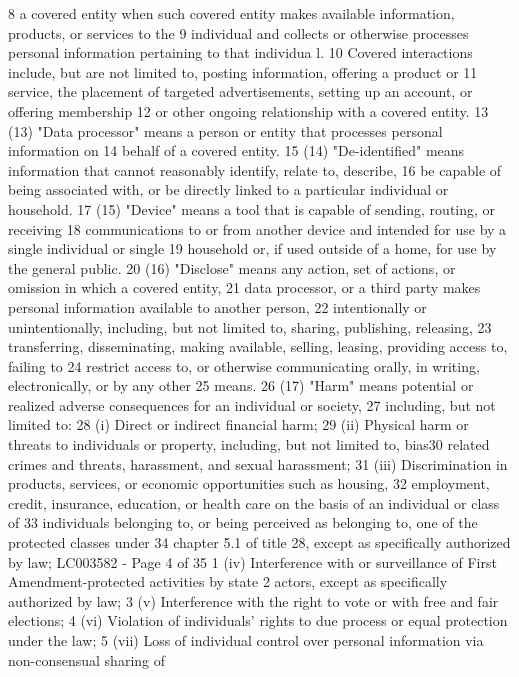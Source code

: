 8 a covered entity when such covered entity makes available information, products, or services to the
9 individual and collects or otherwise processes personal information pertaining to that individua l.
10 Covered interactions include, but are not limited to, posting information, offering a product or
11 service, the placement of targeted advertisements, setting up an account, or offering membership
12 or other ongoing relationship with a covered entity.
13 (13) "Data processor" means a person or entity that processes personal information on
14 behalf of a covered entity.
15 (14) "De-identified" means information that cannot reasonably identify, relate to, describe,
16 be capable of being associated with, or be directly linked to a particular individual or household.
17 (15) "Device" means a tool that is capable of sending, routing, or receiving
18 communications to or from another device and intended for use by a single individual or single
19 household or, if used outside of a home, for use by the general public.
20 (16) "Disclose" means any action, set of actions, or omission in which a covered entity,
21 data processor, or a third party makes personal information available to another person,
22 intentionally or unintentionally, including, but not limited to, sharing, publishing, releasing,
23 transferring, disseminating, making available, selling, leasing, providing access to, failing to
24 restrict access to, or otherwise communicating orally, in writing, electronically, or by any other
25 means.
26 (17) "Harm" means potential or realized adverse consequences for an individual or society,
27 including, but not limited to:
28 (i) Direct or indirect financial harm;
29 (ii) Physical harm or threats to individuals or property, including, but not limited to, bias30 related crimes and threats, harassment, and sexual harassment;
31 (iii) Discrimination in products, services, or economic opportunities such as housing,
32 employment, credit, insurance, education, or health care on the basis of an individual or class of
33 individuals belonging to, or being perceived as belonging to, one of the protected classes under
34 chapter 5.1 of title 28, except as specifically authorized by law;
LC003582 - Page 4 of 35
1 (iv) Interference with or surveillance of First Amendment-protected activities by state
2 actors, except as specifically authorized by law;
3 (v) Interference with the right to vote or with free and fair elections;
4 (vi) Violation of individuals’ rights to due process or equal protection under the law;
5 (vii) Loss of individual control over personal information via non-consensual sharing of
